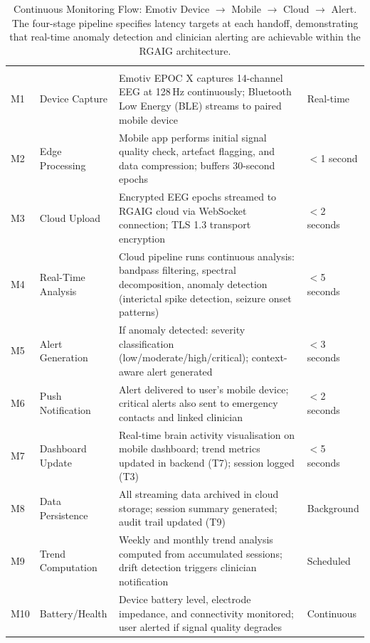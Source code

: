 {\tablestripes\tablefontsize
\begin{xltabular}{\textwidth}{@{} >{\raggedright\arraybackslash}p{0.6cm} >{\raggedright\arraybackslash}p{2.8cm} L >{\raggedright\arraybackslash}p{2.0cm} @{}}
\caption[Continuous Monitoring Flow: Emotiv Device $$ Mobile $$]{Continuous Monitoring Flow: Emotiv Device $\to$ Mobile $\to$ Cloud $\to$ Alert. The four-stage pipeline specifies latency targets at each handoff, demonstrating that real-time anomaly detection and clinician alerting are achievable within the RGAIG architecture.}\label{tab:continuous_monitoring} \\
\toprule
\thead{\#} &  &  &  \\
\midrule
\endfirsthead
\toprule
\thead{\#} &  &  &  \\
\midrule
\endhead
\bottomrule
\endlastfoot
M1 & Device Capture & Emotiv EPOC X captures 14-channel EEG at 128\,Hz continuously; Bluetooth Low Energy (BLE) streams to paired mobile device & Real-time \\
\addlinespace
M2 & Edge Processing & Mobile app performs initial signal quality check, artefact flagging, and data compression; buffers 30-second epochs & $<$1 second \\
\addlinespace
M3 & Cloud Upload & Encrypted EEG epochs streamed to RGAIG cloud via WebSocket connection; TLS 1.3 transport encryption & $<$2 seconds \\
\addlinespace
M4 & Real-Time Analysis & Cloud pipeline runs continuous analysis: bandpass filtering, spectral decomposition, anomaly detection (interictal spike detection, seizure onset patterns) & $<$5 seconds \\
\addlinespace
M5 & Alert Generation & If anomaly detected: severity classification (low/moderate/high/critical); context-aware alert generated & $<$3 seconds \\
\addlinespace
M6 & Push Notification & Alert delivered to user's mobile device; critical alerts also sent to emergency contacts and linked clinician & $<$2 seconds \\
\addlinespace
M7 & Dashboard Update & Real-time brain activity visualisation on mobile dashboard; trend metrics updated in backend (T7); session logged (T3) & $<$5 seconds \\
\addlinespace
M8 & Data Persistence & All streaming data archived in cloud storage; session summary generated; audit trail updated (T9) & Background \\
\addlinespace
M9 & Trend Computation & Weekly and monthly trend analysis computed from accumulated sessions; drift detection triggers clinician notification & Scheduled \\
\addlinespace
M10 & Battery/Health & Device battery level, electrode impedance, and connectivity monitored; user alerted if signal quality degrades & Continuous \\
\end{xltabular}}
